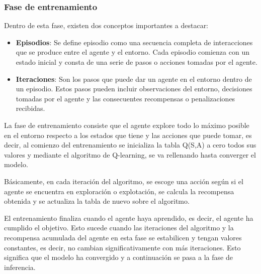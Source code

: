 \subsubsection{Fase de entrenamiento}
\label{sec:entrenamiento}
 Dentro de esta fase, existen dos conceptos importantes a destacar:
 \begin{itemize}
  \item \textbf{Episodios}: Se define episodio como una secuencia completa de interacciones que se produce entre el agente y el entorno. Cada episodio comienza con un estado inicial y consta de una serie 
  de pasos o acciones tomadas por el agente.
  \item \textbf{Iteraciones}: Son los pasos que puede dar un agente en el entorno dentro de un episodio. Estos pasos pueden incluir observaciones del entorno, decisiones tomadas por el agente
  y las consecuentes recompensas o penalizaciones recibidas.
\end{itemize}

 La fase de entrenamiento consiste que el agente explore todo lo máximo posible en el entorno respecto a los estados que tiene y las acciones que puede tomar, es decir, al comienzo del 
 entrenamiento se inicializa la tabla Q(S,A) a cero todos sus valores y mediante el algoritmo de Q-learning, se va rellenando hasta converger el modelo. \newline
 
 Básicamente, en cada iteración del algoritmo, se escoge una acción según si el agente se encuentra en exploración o explotación, se calcula la recompensa obtenida y se actualiza la 
 tabla de nuevo sobre el algoritmo.

 El entrenamiento finaliza cuando el agente haya aprendido, es decir, el agente ha cumplido el objetivo. Esto sucede cuando las iteraciones del algoritmo y la recompensa acumulada del agente en esta 
 fase se estabilicen y tengan valores constantes, es decir, no cambian significativamente con más iteraciones. Esto significa que el modelo ha convergido y a continuación se pasa
 a la fase de inferencia. \newline

